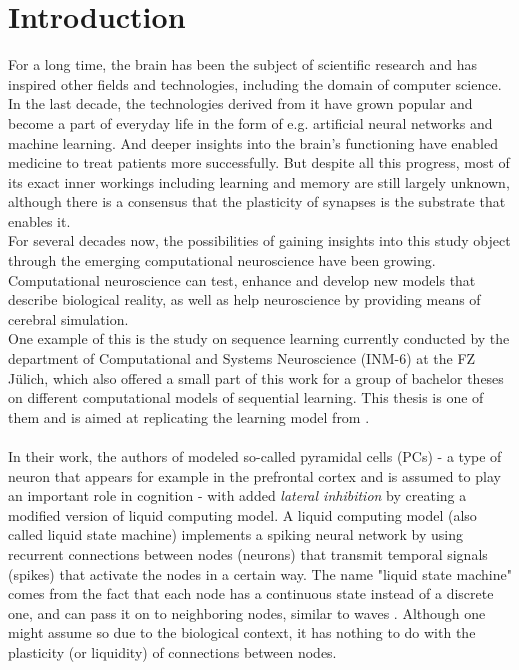 
\chapter{Introduction} %

\label{Chapter1} %

For a long time, the brain has been the subject of scientific research and has inspired other fields and technologies, including the domain of computer science. In the last decade, the technologies derived from it have grown popular and become a part of everyday life in the form of e.g. artificial neural networks and machine learning. And deeper insights into the brain's functioning have enabled medicine to treat patients more successfully. But despite all this progress, most of its exact inner workings including learning and memory are still largely unknown, although there is a consensus that the plasticity of synapses is the substrate that enables it.\\
For several decades now, the possibilities of gaining insights into this study object through the emerging computational neuroscience have been growing. Computational neuroscience can test, enhance and develop new models that describe biological reality, as well as help neuroscience by providing means of cerebral simulation.\\
One example of this is the study on sequence learning currently conducted by the department of Computational and Systems Neuroscience (INM-6) at the FZ Jülich, which also offered a small part of this work for a group of bachelor theses on different computational models of sequential learning.
This thesis is one of them and is aimed at replicating the learning model from \parencite{klampfl_maass_2013}.
\\ \ \\
In their work, the authors of \parencite{klampfl_maass_2013} modeled so-called pyramidal cells (PCs) - a type of neuron that appears for example in the prefrontal cortex and is assumed to play an important role in cognition \parencite{10.1093/cercor/bhg093} - with added \textit{lateral inhibition} by creating a modified version of liquid computing model. A liquid computing model (also called liquid state machine) implements a spiking neural network by using recurrent connections between nodes (neurons) that transmit temporal signals (spikes) that activate the nodes in a certain way. The name "liquid state machine" comes from the fact that each node has a continuous state instead of a discrete one, and can pass it on to neighboring nodes, similar to waves  \parencite{maass_markram_2004}. Although one might assume so due to the biological context, it has nothing to do with the plasticity (or liquidity) of connections between nodes.
